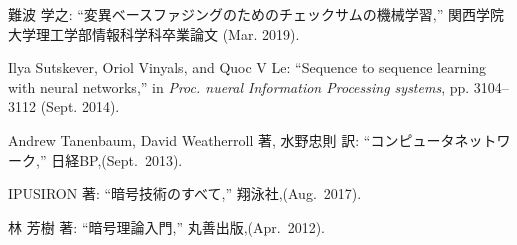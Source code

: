 \documentclass[11pt]{jbook}
\begin{document}
\begin{thebibliography}{99}

  難波 学之:
``変異ベースファジングのためのチェックサムの機械学習,''
関西学院大学理工学部情報科学科卒業論文 (Mar. 2019).

  Ilya Sutskever, Oriol Vinyals, and Quoc V Le:
 ``Sequence to sequence learning with neural networks,''
 in \textit{Proc. nueral Information Processing systems}, pp. 3104–3112 (Sept. 2014).

  Andrew Tanenbaum, David Weatherroll 著, 水野忠則 訳:
   ``コンピュータネットワーク,''
  日経BP,(Sept.\ 2013).

   IPUSIRON 著:
   ``暗号技術のすべて,''
  翔泳社,(Aug.\ 2017).

   林 芳樹 著:
   ``暗号理論入門,''
  丸善出版,(Apr.\ 2012).



\end{thebibliography}
\end{document}
